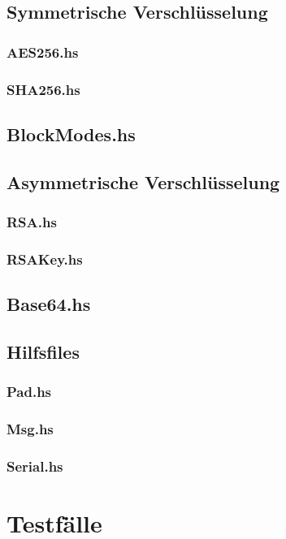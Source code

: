 \documentclass[11pt,a4paper,parskip=half]{scrartcl}
\begin{document}
\subsection{Symmetrische Verschlüsselung}
\subsubsection{AES256.hs}

\subsubsection{SHA256.hs}

\subsection{BlockModes.hs}

\subsection{Asymmetrische Verschlüsselung}
\subsubsection{RSA.hs}

\subsubsection{RSAKey.hs}

\subsection{Base64.hs}

\subsection{Hilfsfiles}
\subsubsection{Pad.hs}

\subsubsection{Msg.hs}

\subsubsection{Serial.hs}




\section{Testfälle}

\end{document}
